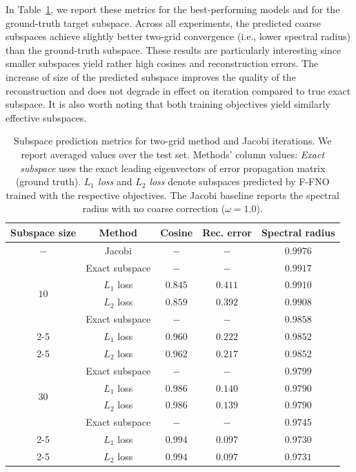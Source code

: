 \documentclass{article}
\begin{document}
In Table~\ref{table:twogrid_metrics}, we report these metrics for the best-performing models and for the ground-truth target subspace. Across all experiments, the predicted coarse subspaces achieve slightly better two-grid convergence (i.e., lower spectral radius) than the ground-truth subspace. These results are particularly interesting since smaller subspaces yield rather high cosines and reconstruction errors. The increase of size of the predicted subspace improves the quality of the reconstruction and does not degrade in effect on iteration compared to true exact subspace. It is also worth noting that both training objectives yield similarly effective subspaces.

\begin{table}[ht]
    \caption{Subspace prediction metrics for two-grid method and Jacobi iterations. We report averaged values over the test set. Methods' column values: \textit{Exact subspace} uses the exact leading eigenvectors of error propagation matrix (ground truth). \textit{$L_1$ loss} and \textit{$L_2$ loss} denote subspaces predicted by F-FNO trained with the respective objectives. The Jacobi baseline reports the spectral radius with no coarse correction ($\omega=1.0$).}
    \label{table:twogrid_metrics}
    \centering
    \begin{tabular}{@{}ccccc@{}} 
        \\\toprule
        Subspace size & Method & Cosine & Rec. error & Spectral radius \\\midrule
        $-$ & Jacobi & $-$ & $-$ & $0.9976$ \\\midrule
        \multirow{4}{*}{$10$} & Exact subspace & $-$ & $-$ & $0.9917$ \\\cmidrule(r){2-5}
         & $L_1$ loss & $0.845$ & $0.411$ & $0.9910$ \\\cmidrule(r){2-5}
         & $L_2$ loss & $0.859$ & $0.392$ & $0.9908$ \\\midrule
        \multirow{4}{*}{$20$} & Exact subspace & $-$ & $-$ & $0.9858$ \\\cmidrule(r){2-5}
         & $L_1$ loss & $0.960$ & $0.222$ & $0.9852$ \\\cmidrule(r){2-5}
         & $L_2$ loss & $0.962$ & $0.217$ & $0.9852$ \\\midrule
        \multirow{4}{*}{$30$} & Exact subspace & $-$ & $-$ & $0.9799$ \\\cmidrule(r){2-5}
         & $L_1$ loss & $0.986$ & $0.140$ & $0.9790$ \\\cmidrule(r){2-5}
         & $L_2$ loss & $0.986$ & $0.139$ & $0.9790$ \\\midrule
        \multirow{4}{*}{$40$} & Exact subspace & $-$ & $-$ & $0.9745$ \\\cmidrule(r){2-5}
         & $L_1$ loss & $0.994$ & $0.097$ & $0.9730$ \\\cmidrule(r){2-5}
         & $L_2$ loss & $0.994$ & $0.097$ & $0.9731$ \\
        \bottomrule
    \end{tabular}
\end{table}
\end{document}
